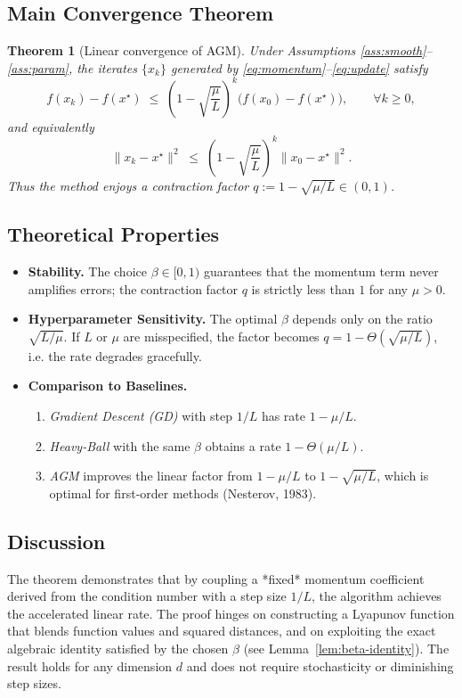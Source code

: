 \documentclass[11pt]{article}
\newtheorem{theorem}{Theorem}[section]
\begin{document}
\subsection*{Main Convergence Theorem}
\begin{theorem}[Linear convergence of AGM]\label{thm:linear}
Under Assumptions \ref{ass:smooth}--\ref{ass:param}, the iterates $\{x_k\}$ generated by \eqref{eq:momentum}--\eqref{eq:update} satisfy
\[
    f(x_k)-f(x^\star)\;\le\;
    \left(1-\sqrt{\frac{\mu}{L}}\right)^{k}\bigl(f(x_0)-f(x^\star)\bigr),
    \qquad\forall k\ge 0,
\]
and equivalently
\[
    \|x_k-x^\star\|^2\;\le\;
    \left(1-\sqrt{\frac{\mu}{L}}\right)^{k}\|x_0-x^\star\|^2 .
\]
Thus the method enjoys a contraction factor $q:=1-\sqrt{\mu/L}\in(0,1)$.
\end{theorem}

\subsection*{Theoretical Properties}
\begin{itemize}
\item \textbf{Stability.} The choice $\beta\in[0,1)$ guarantees that the momentum term never amplifies errors; the contraction factor $q$ is strictly less than $1$ for any $\mu>0$.
\item \textbf{Hyperparameter Sensitivity.} The optimal $\beta$ depends only on the ratio $\sqrt{L/\mu}$. If $L$ or $\mu$ are misspecified, the factor becomes $q = 1-\Theta(\sqrt{\mu/L})$, i.e. the rate degrades gracefully.
\item \textbf{Comparison to Baselines.}
    \begin{enumerate}[label=(\alph*)]
        \item \emph{Gradient Descent (GD)} with step $1/L$ has rate $1-\mu/L$.
        \item \emph{Heavy‑Ball} with the same $\beta$ obtains a rate $1-\Theta(\mu/L)$.
        \item \emph{AGM} improves the linear factor from $1-\mu/L$ to $1-\sqrt{\mu/L}$, which is optimal for first‑order methods (Nesterov, 1983).
    \end{enumerate}
\end{itemize}

\subsection*{Discussion}
The theorem demonstrates that by coupling a *fixed* momentum coefficient derived from the condition number with a step size $1/L$, the algorithm achieves the accelerated linear rate. The proof hinges on constructing a Lyapunov function that blends function values and squared distances, and on exploiting the exact algebraic identity satisfied by the chosen $\beta$ (see Lemma~\ref{lem:beta-identity}). The result holds for any dimension $d$ and does not require stochasticity or diminishing step sizes.
\end{document}
